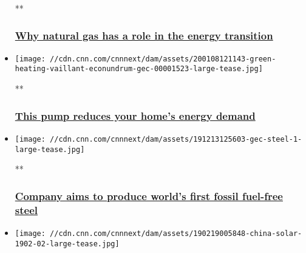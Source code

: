 \begin{itemize}
  **

  \hypertarget{why-natural-gas-has-a-role-in-the-energy-transition}{%
  \subsubsection{\texorpdfstring{\href{/videos/business/2020/01/07/natural-gas-energy-gec.cnn-business}{Why
  natural gas has a role in the energy
  transition}}{Why natural gas has a role in the energy transition}}\label{why-natural-gas-has-a-role-in-the-energy-transition}}
\item
  \href{/videos/business/2020/01/08/green-heating-vaillant-econundrum-gec.cnn-business}{}

  \texttt{[image: //cdn.cnn.com/cnnnext/dam/assets/200108121143-green-heating-vaillant-econundrum-gec-00001523-large-tease.jpg]}

  **

  \hypertarget{this-pump-reduces-your-homes-energy-demand}{%
  \subsubsection{\texorpdfstring{\href{/videos/business/2020/01/08/green-heating-vaillant-econundrum-gec.cnn-business}{This
  pump reduces your home's energy
  demand}}{This pump reduces your home's energy demand}}\label{this-pump-reduces-your-homes-energy-demand}}
\item
  \href{/videos/business/2019/12/13/steel-sweden-carbon-dioxide-emissions-ssab-vattenfall-lkab-stewart.cnn}{}

  \texttt{[image: //cdn.cnn.com/cnnnext/dam/assets/191213125603-gec-steel-1-large-tease.jpg]}

  **

  \hypertarget{company-aims-to-produce-worlds-first-fossil-fuel-free-steel}{%
  \subsubsection{\texorpdfstring{\href{/videos/business/2019/12/13/steel-sweden-carbon-dioxide-emissions-ssab-vattenfall-lkab-stewart.cnn}{Company
  aims to produce world's first fossil fuel-free
  steel}}{Company aims to produce world's first fossil fuel-free steel}}\label{company-aims-to-produce-worlds-first-fossil-fuel-free-steel}}
\item
  \href{/2019/08/15/business/china-solar-electricity-scli-intl/index.html}{}

  \texttt{[image: //cdn.cnn.com/cnnnext/dam/assets/190219005848-china-solar-1902-02-large-tease.jpg]}


\end{itemize}
